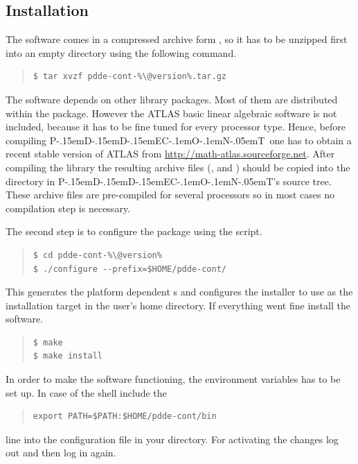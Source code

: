 \documentclass[10pt,a4paper]{ddedoc}
\def\pdde{{P\kern-.15emD\kern-.15emD\kern-.15emE\raisebox{.25ex}{-}C\kern-.1emO\kern-.1emN\kern-.05emT}}
\begin{document}
\subsection{Installation}

The software comes in a compressed archive form , so it has to be unzipped first into an empty directory using the following command.
{ \small \begin{quote} \begin{lstlisting}[basicstyle=\ttfamily,frame=single]
$ tar xvzf pdde-cont-%\@version%.tar.gz
\end{lstlisting} \end{quote} } \noindent
The software depends on other library packages. Most of them are distributed within the package. However the ATLAS basic linear algebraic software is not included, because it has to be fine tuned for every processor type. Hence, before compiling \pdde\ one has to obtain a recent stable version of ATLAS from \url{http://math-atlas.sourceforge.net}. After compiling the library the resulting archive files (,  and ) should be copied into the  directory in \pdde 's source tree. These archive files are pre-compiled for several processors so in most cases no compilation step is necessary.

The second step is to configure the package using the  script.
{ \small \begin{quote} \begin{lstlisting}[basicstyle=\tt,frame=single]
$ cd pdde-cont-%\@version%
$ ./configure --prefix=$HOME/pdde-cont/
\end{lstlisting} \end{quote} } \noindent
This generates the platform dependent s and configures the installer to use  as the installation target in the user's home directory. If everything went fine install the software.
{ \small \begin{quote} \begin{lstlisting}[basicstyle=\tt,frame=single]
$ make
$ make install
\end{lstlisting} \end{quote} } \noindent
In order to make the software functioning, the  environment variables has to be set up. In case of the  shell include the
{ \small \begin{quote} \begin{lstlisting}[basicstyle=\tt,frame=single]
export PATH=$PATH:$HOME/pdde-cont/bin
\end{lstlisting} \end{quote} } \noindent
line into the  configuration file in your  directory. For activating the changes log out and then log in again.
\end{document}
